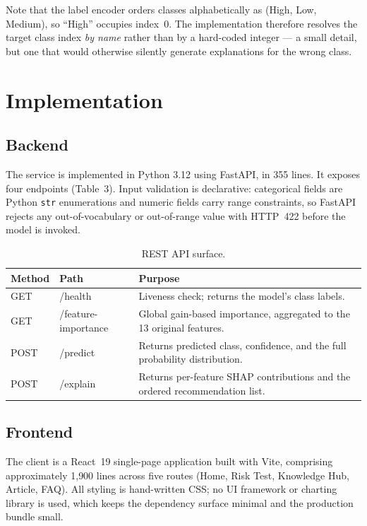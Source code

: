 \documentclass[11pt,a4paper]{article}
\begin{document}
Note that the label encoder orders classes alphabetically as
(High, Low, Medium), so ``High'' occupies index~0. The implementation therefore
resolves the target class index \emph{by name} rather than by a hard-coded
integer --- a small detail, but one that would otherwise silently generate
explanations for the wrong class.

\section{Implementation}

\subsection{Backend}
The service is implemented in Python 3.12 using FastAPI, in 355 lines. It
exposes four endpoints (Table~3). Input validation is declarative: categorical
fields are Python \texttt{str} enumerations and numeric fields carry range
constraints, so FastAPI rejects any out-of-vocabulary or out-of-range value with
HTTP~422 before the model is invoked.

\begin{table}[h!]
\centering\small
\begin{tabular}{@{}llp{7.4cm}@{}}
\toprule
\textbf{Method} & \textbf{Path} & \textbf{Purpose} \\
\midrule
GET  & /health             & Liveness check; returns the model's class labels. \\
GET  & /feature-importance & Global gain-based importance, aggregated to the 13
                             original features. \\
POST & /predict            & Returns predicted class, confidence, and the full
                             probability distribution. \\
POST & /explain            & Returns per-feature SHAP contributions and the
                             ordered recommendation list. \\
\bottomrule
\end{tabular}
\caption{REST API surface.}
\end{table}

\subsection{Frontend}
The client is a React~19 single-page application built with Vite, comprising
approximately 1{,}900 lines across five routes (Home, Risk Test, Knowledge Hub,
Article, FAQ). All styling is hand-written CSS; no UI framework or charting
library is used, which keeps the dependency surface minimal and the production
bundle small.
\end{document}
